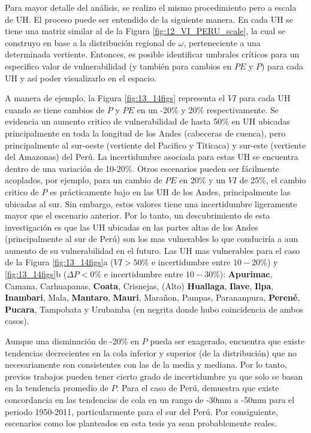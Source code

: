\documentclass[12pt]{article}
\begin{document}
\thispagestyle{empty}

Para mayor detalle del análisis, se realizo el mismo procedimiento pero a escala de UH. El proceso puede ser entendido de la siguiente manera. En cada UH se tiene una matriz similar al de la Figura \ref{fig:12_VI_PERU_scale}, la cual se construyo en base a la distribución regional de $\omega$, perteneciente a una determinada vertiente. Entonces, es posible identificar umbrales críticos para un especifico valor de vulnerabilidad (y también para cambios en $PE$ y $P$) para cada UH y así poder visualizarlo en el espacio. 

A manera de ejemplo, la Figura \ref{fig:13_14figs} representa el $VI$ para cada UH cuando se tiene cambios de $P$ y $PE$ en un -20\% y 20\% respectivamente. Se evidencia un aumento critico de vulnerabilidad de hasta 50\% en UH ubicadas principalmente en toda la longitud de los Andes (cabeceras de cuenca), pero principalmente al sur-oeste (vertiente del Pacifico y Titicaca) y sur-este (vertiente del Amazonas) del Perú. La incertidumbre asociada para estas UH se encuentra dentro de una variación de 10-20\%. Otros escenarios pueden ser fácilmente acoplados, por ejemplo, para un cambio de $PE$ en 20\% y un $VI$ de 25\%, el cambio critico de $P$ es prácticamente bajo en las UH de los Andes, principalmente las ubicadas al sur. Sin embargo, estos valores tiene una incertidumbre ligeramente mayor que el escenario anterior. Por lo tanto, un descubrimiento de esta investigación es que las UH ubicadas en las partes altas de los Andes (principalmente al sur de Perú) son los mas vulnerables lo que conduciría a aun aumento de su vulnerabilidad en el futuro. Las UH mas vulnerables para el caso de la Figura \ref{fig:13_14figs}a ($VI > 50\%$ e incertidumbre entre $10-20\%$) y \ref{fig:13_14figs}b ($\Delta P < 0\%$ e incertidumbre entre $10-30\%$): \textbf{Apurimac}, Camana, Carhuapanas, \textbf{Coata}, Crisnejas, (Alto) \textbf{Huallaga}, \textbf{Ilave}, \textbf{Ilpa}, \textbf{Inambari}, Mala, \textbf{Mantaro}, \textbf{Mauri}, Marañon, Pampas, Parananpura, \textbf{Perené}, \textbf{Pucara}, Tampobata y Urubamba (en negrita donde hubo coincidencia de ambos casos).

Aunque una disminución de -20\% en $P$ pueda ser exagerado, \citet{lausier2018overlooked} encuentra que existe tendencias decrecientes en la cola inferior y superior (de la distribución) que no necesariamente son consistentes con las de la media y mediana. Por lo tanto, previos trabajos pueden tener cierto grado de incertidumbre ya que solo se basan en la tendencia promedio de $P$. Para el caso de Perú, \citet{lausier2018overlooked} demuestra que existe concordancia en las tendencias de cola en un rango de -30mm a -50mm para el periodo 1950-2011, particularmente para el sur del Perú. Por consiguiente, escenarios como los planteados en esta tesis ya sean probablemente reales.
\end{document}
